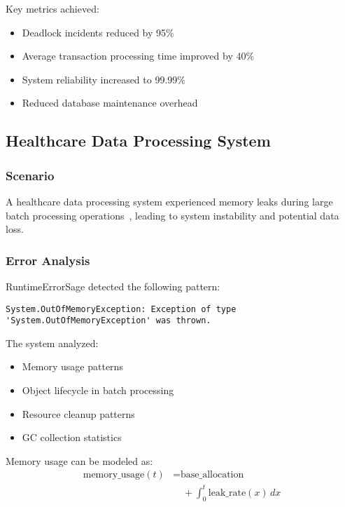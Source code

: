 Key metrics achieved:
\begin{itemize}
    \item Deadlock incidents reduced by 95\%
    \item Average transaction processing time improved by 40\%
    \item System reliability increased to 99.99\%
    \item Reduced database maintenance overhead
\end{itemize}

\subsection{Healthcare Data Processing System}

\subsubsection{Scenario}
A healthcare data processing system experienced memory leaks during large batch processing operations~\cite{memory_management_2023}, leading to system instability and potential data loss.

\subsubsection{Error Analysis}
RuntimeErrorSage detected the following pattern:
\begin{lstlisting}[style=csharpstyle,caption={Memory Leak Error}]
System.OutOfMemoryException: Exception of type 'System.OutOfMemoryException' was thrown.
\end{lstlisting}

The system analyzed:
\begin{itemize}
    \item Memory usage patterns
    \item Object lifecycle in batch processing
    \item Resource cleanup patterns
    \item GC collection statistics
\end{itemize}

Memory usage can be modeled as:
\begin{equation}
\begin{split}
\text{memory\_usage}(t) &= \text{base\_allocation} \\
&\quad + \int_{0}^{t} \text{leak\_rate}(x) \,dx
\end{split}
\end{equation}

